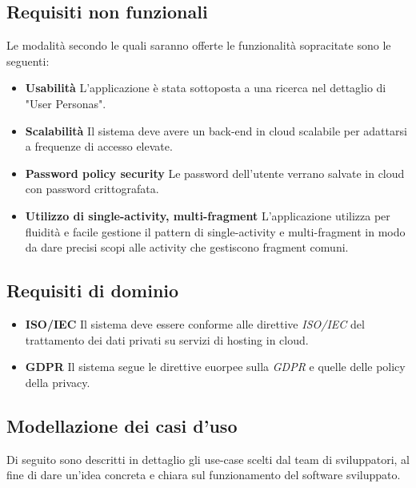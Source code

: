 \subsection{Requisiti non funzionali}
Le modalità secondo le quali saranno offerte le funzionalità sopracitate sono le seguenti:
\begin{itemize}
  \item \textbf{Usabilità} L'applicazione è stata sottoposta a una ricerca nel dettaglio di
        "User Personas".
  \item \textbf{Scalabilità}
        Il sistema deve avere un back-end in cloud scalabile per adattarsi a frequenze di accesso elevate.
  \item \textbf{Password policy security} Le password dell'utente verrano salvate in
        cloud con password crittografata.
  \item \textbf{Utilizzo di single-activity, multi-fragment} L'applicazione utilizza per
        fluidità e facile gestione il pattern di single-activity e multi-fragment in modo
        da dare precisi scopi alle activity che gestiscono fragment comuni.
\end{itemize}
\subsection{Requisiti di dominio}
\begin{itemize}
  \item \textbf{ISO/IEC} Il sistema deve essere conforme alle direttive \textit{ISO/IEC} del trattamento dei dati privati su servizi di hosting in cloud.
  \item \textbf{GDPR} Il sistema segue le direttive euorpee sulla \textit{GDPR} e quelle delle policy della privacy.
\end{itemize}
\subsection{Modellazione dei casi d'uso}
Di seguito sono descritti in dettaglio gli use-case scelti dal team di sviluppatori, al fine di dare un'idea concreta e chiara sul funzionamento del software sviluppato.

